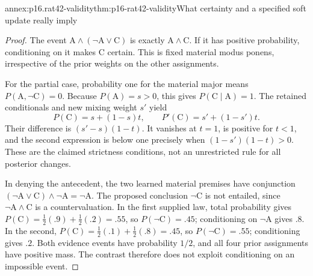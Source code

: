 \begin{annexitem}{annex:p16.rat42-validity}{thm:p16-rat42-validity}{What certainty and a specified soft update really imply}
\begin{proof}
The event \(\mathrm A\land(\neg\mathrm A\lor\mathrm C)\)
is exactly \(\mathrm A\land\mathrm C\). If it has positive
probability, conditioning on it makes \(\mathrm C\) certain.
This is fixed material modus ponens, irrespective of the prior
weights on the other assignments.

For the partial case, probability one for the material major
means \(P(\mathrm A,\neg\mathrm C)=0\). Because
\(P(\mathrm A)=s>0\), this gives
\(P(\mathrm C\mid\mathrm A)=1\). The retained conditionals
and new mixing weight \(s'\) yield
\[
 P(\mathrm C)=s+(1-s)t,
 \qquad P'(\mathrm C)=s'+(1-s')t.
\]
Their difference is \((s'-s)(1-t)\). It vanishes at \(t=1\),
is positive for \(t<1\), and the second expression is below
one precisely when \((1-s')(1-t)>0\). These are the claimed
strictness conditions, not an unrestricted rule for all posterior changes.

In denying the antecedent, the two learned material premises
have conjunction
\((\neg\mathrm A\lor\mathrm C)\land\neg\mathrm A
 =\neg\mathrm A\).
The proposed conclusion \(\neg\mathrm C\) is not entailed,
since \(\neg\mathrm A\land\mathrm C\) is a countervaluation.
In the first supplied law, total probability gives
\(P(\mathrm C)=\tfrac12(.9)+\tfrac12(.2)=.55\),
so \(P(\neg\mathrm C)=.45\); conditioning on
\(\neg\mathrm A\) gives \(.8\). In the second,
\(P(\mathrm C)=\tfrac12(.1)+\tfrac12(.8)=.45\),
so \(P(\neg\mathrm C)=.55\); conditioning gives \(.2\).
Both evidence events have probability \(1/2\), and all four
prior assignments have positive mass. The contrast therefore
does not exploit conditioning on an impossible event.
\end{proof}
\end{annexitem}

